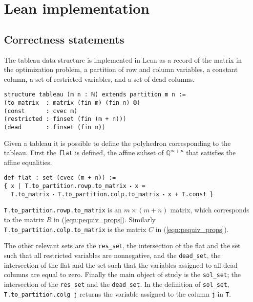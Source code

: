 \documentclass[11pt]{article} %
\begin{document}
\section{Lean implementation}

\subsection{Correctness statements}

The tableau data structure is implemented in Lean as a record of the matrix in the optimization problem, a partition of row and column variables, a constant column, a set of restricted variables, and a set of dead columns.

\begin{lstlisting}
structure tableau (m n : ℕ) extends partition m n :=
(to_matrix  : matrix (fin m) (fin n) ℚ)
(const      : cvec m)
(restricted : finset (fin (m + n)))
(dead       : finset (fin n))
\end{lstlisting}
Given a tableau it is possible to define the polyhedron corresponding to the tableau. First the \verb|flat| is defined, the affine subset of $\mathbb{Q}^{m + n}$ that satisfies the affine equalities.

\begin{lstlisting}
def flat : set (cvec (m + n)) :=
{ x | T.to_partition.rowp.to_matrix ⬝ x =
  T.to_matrix ⬝ T.to_partition.colp.to_matrix ⬝ x + T.const }
\end{lstlisting}

\verb|T.to_partition.rowp.to_matrix| is an $m \times (m + n)$ matrix, which corresponds to the matrix $R$ in (\ref{eqn:pequiv_props}). Similarly \verb|T.to_partition.colp.to_matrix| is the matrix $C$ in (\ref{eqn:pequiv_props}).

The other relevant sets are the \verb|res_set|, the intersection of the flat and the set such that all restricted variables are nonnegative, and the \verb|dead_set|, the intersection of the flat and the set such that the variables assigned to all dead columns are equal to zero. Finally the main object of study is the \verb|sol_set|; the intersection of the \verb|res_set| and the \verb|dead_set|. In the definition of \lstinline|sol_set|, \lstinline|T.to_partition.colg j| returns the variable assigned to the column \lstinline |j| in \lstinline|T|.
\end{document}
